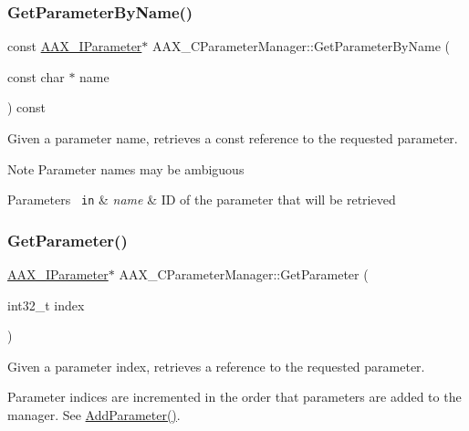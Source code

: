 \subsubsection{\texorpdfstring{GetParameterByName()}{GetParameterByName()}\hspace{0.1cm}{\footnotesize\ttfamily [2/2]}}
{\footnotesize\ttfamily const \mbox{\hyperlink{a01857}{A\+A\+X\+\_\+\+I\+Parameter}}$\ast$ A\+A\+X\+\_\+\+C\+Parameter\+Manager\+::\+Get\+Parameter\+By\+Name (\begin{DoxyParamCaption}\item[{const char $\ast$}]{name }\end{DoxyParamCaption}) const}



Given a parameter name, retrieves a const reference to the requested parameter. 

\begin{DoxyNote}{Note}
Parameter names may be ambiguous
\end{DoxyNote}

\begin{DoxyParams}[1]{Parameters}
\mbox{\texttt{ in}}  & {\em name} & ID of the parameter that will be retrieved \\
\hline
\end{DoxyParams}
\mbox{\label{a01545_aaee339546c6cf99e3b7c8a6061c7a4f3}} 
\subsubsection{\texorpdfstring{GetParameter()}{GetParameter()}\hspace{0.1cm}{\footnotesize\ttfamily [1/2]}}
{\footnotesize\ttfamily \mbox{\hyperlink{a01857}{A\+A\+X\+\_\+\+I\+Parameter}}$\ast$ A\+A\+X\+\_\+\+C\+Parameter\+Manager\+::\+Get\+Parameter (\begin{DoxyParamCaption}\item[{int32\+\_\+t}]{index }\end{DoxyParamCaption})}



Given a parameter index, retrieves a reference to the requested parameter. 

Parameter indices are incremented in the order that parameters are added to the manager. See \mbox{\hyperlink{a01545_ae2f9631b33c012f7a8c042df9655b28c}{Add\+Parameter()}}.


